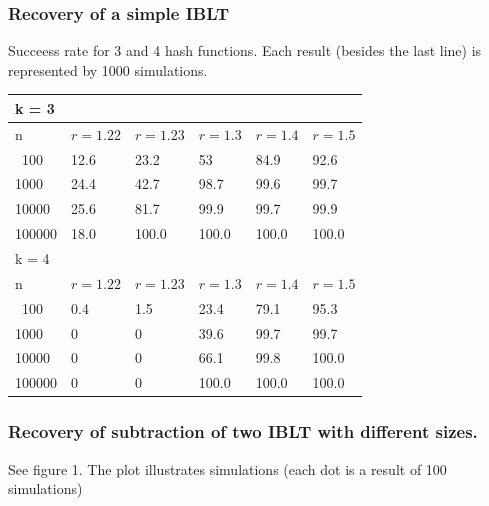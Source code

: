 \documentclass{article}
\begin{document}
\subsubsection{Recovery of a simple IBLT}
Succeess rate for 3 and 4 hash functions. Each result (besides the last line) is 
represented by 1000 simulations. 

\begin{center}
\begin{tabular}{l | l | l | l | l | l} \hline \hline k = 3 \\ \hline
    \hline n & $r = 1.22$ &  $r = 1.23$  &  $r = 1.3$ & $r = 1.4$ & $r = 1.5$\\ \hline
    \hline \ 100 & 12.6 & 23.2 & 53 & 84.9 & 92.6 \\ \hline 
    1000 & 24.4 & 42.7 & 98.7 & 99.6 & 99.7 \\ \hline
    10000 & 25.6 & 81.7 & 99.9 & 99.7 & 99.9 \\ \hline
    100000 & 18.0 & 100.0 & 100.0 & 100.0 & 100.0 \\ \hline
    \hline
    k = 4 \\
    \hline
    \hline n & $r = 1.22$ &  $r = 1.23$  &  $r = 1.3$ & $r = 1.4$ & $r = 1.5$\\ \hline
    \hline \ 100 & 0.4 & 1.5 & 23.4 & 79.1 & 95.3 \\ \hline 
    1000 & 0 & 0 & 39.6 & 99.7 & 99.7 \\ \hline
    10000 & 0 & 0 & 66.1 & 99.8 & 100.0 \\ \hline
    100000 & 0 & 0 & 100.0 & 100.0 & 100.0 \\ \hline
\end{tabular}
\end{center}


\subsubsection{Recovery of subtraction of two IBLT with different sizes.}

See figure 1. The plot illustrates simulations (each dot is a result of 100 
simulations)
\end{document}
